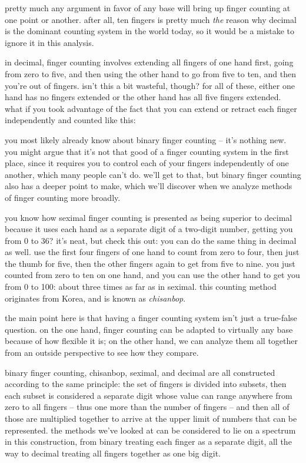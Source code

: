 \documentclass[../best.tex]{subfiles}
\begin{document}

pretty much any argument in favor of any base will bring up finger counting at one point or another. after all, ten fingers is pretty much \emph{the} reason why decimal is the dominant counting system in the world today, so it would be a mistake to ignore it in this analysis.

in decimal, finger counting involves extending all fingers of one hand first, going from zero to five, and then using the other hand to go from five to ten, and then you're out of fingers. isn't this a bit wasteful, though? for all of these, either one hand has no fingers extended or the other hand has all five fingers extended. what if you took advantage of the fact that you can extend or retract each finger independently and counted like this:

you most likely already know about binary finger counting -- it's nothing new.\myfootnote{} you might argue that it's not that good of a finger counting system in the first place, since it requires you to control each of your fingers independently of one another, which many people can't do. we'll get to that, but binary finger counting also has a deeper point to make, which we'll discover when we analyze methods of finger counting more broadly.

you know how seximal finger counting is presented as being superior to decimal because it uses each hand as a separate digit of a two-digit number, getting you from 0 to 36?\myfootnote{} it's neat, but check this out: you can do the same thing in decimal as well. use the first four fingers of one hand to count from zero to four, then just the thumb for five, then the other fingers again to get from five to nine. you just counted from zero to ten on one hand, and you can use the other hand to get you from 0 to 100: about three times as far as in seximal. this counting method originates from Korea, and is known as {\it chisanbop}.\myfootnote{}

the main point here is that having a finger counting system isn't just a true-false question. on the one hand, finger counting can be adapted to virtually any base because of how flexible it is; on the other hand, we can analyze them all together from an outside perspective to see how they compare.

binary finger counting, chisanbop, seximal, and decimal are all constructed according to the same principle: the set of fingers is divided into subsets, then each subset is considered a separate digit whose value can range anywhere from zero to all fingers -- thus one more than the number of fingers -- and then all of those are multiplied together to arrive at the upper limit of numbers that can be represented. the methods we've looked at can be considered to lie on a spectrum in this construction, from binary treating each finger as a separate digit, all the way to decimal treating all fingers together as one big digit.\myfootnote{}
\end{document}
